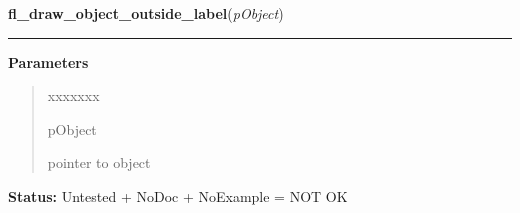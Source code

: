 \hspace{.8\funcindent}\begin{boxedminipage}{\funcwidth}

    \raggedright \textbf{fl\_draw\_object\_outside\_label}(\textit{pObject})

    \vspace{-1.5ex}

    \rule{\textwidth}{0.5\fboxrule}
\setlength{\parskip}{2ex}
\setlength{\parskip}{1ex}
      \textbf{Parameters}
      \vspace{-1ex}

      \begin{quote}
        \begin{Ventry}{xxxxxxx}

          \item[pObject]

          pointer to object

        \end{Ventry}

      \end{quote}

\textbf{Status:} Untested + NoDoc + NoExample = NOT OK



    \end{boxedminipage}

    \label{xformslib:library:fl_set_object_dblclick}

    \vspace{0.5ex}

